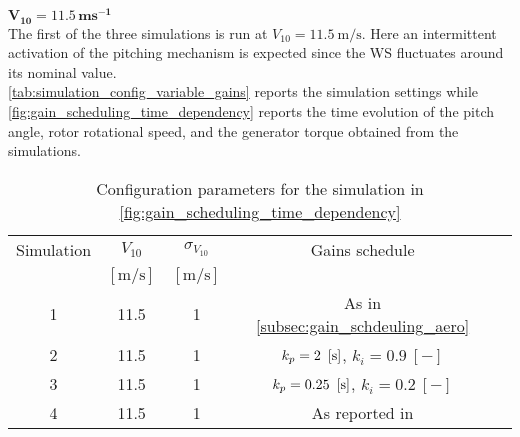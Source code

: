 $\mathbf{V_{10}=11.5 \, ms^{-1}}$\\
The first of the three simulations is run at $V_{10} = 11.5 \ \si{\meter\per\second}$. Here an intermittent activation of the pitching mechanism is expected since the WS fluctuates around its nominal value.\\
\autoref{tab:simulation_config_variable_gains} reports the simulation settings while \autoref{fig:gain_scheduling_time_dependency} reports the time evolution of the pitch angle, rotor rotational speed, and the generator torque obtained from the simulations. 

\begin{table}[!htbp]
  \caption{Configuration parameters for the simulation in \autoref{fig:gain_scheduling_time_dependency}}
  \centering
  \begin{tabular}{ccccc}
  \toprule
    Simulation & $V_{10}$  & $\sigma_{V_{10}}$ & Gains schedule \\ 
     & $\left[\si{\meter\per\second}\right]$ & $\left[\si{\meter\per\second}\right]$ & \\ \midrule       
     1 & 11.5 & 1 & As in \autoref{subsec:gain_schdeuling_aero}  \\
     2 & 11.5 & 1 & $k_p = 2 \ \mesunt{\second}$, $k_i=0.9 \ [-]$ \\
     3 & 11.5 & 1 & $k_p = 0.25 \ \mesunt{\second}$, $k_i=0.2 \ [-]$  \\
     4 & 11.5 & 1 & As reported in \cite{Olimpo_Anaya‐Lara}  \\
     \bottomrule
  \end{tabular}
  \label{tab:simulation_config_variable_gains}
\end{table}

